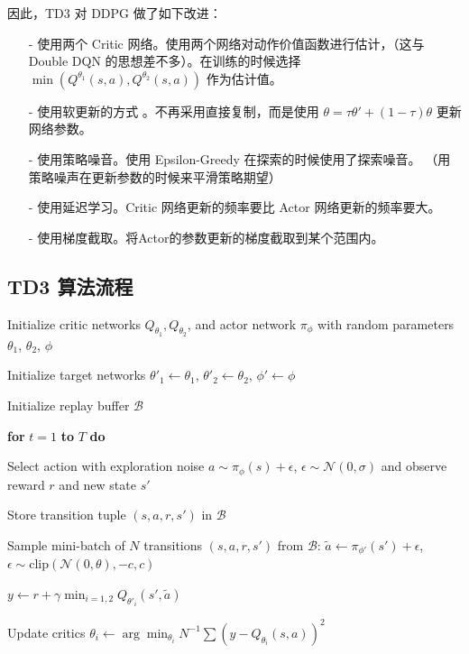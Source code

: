 因此，TD3 对 DDPG 做了如下改进：
\begin{itemize}
\item[-]
使用两个 Critic 网络。使用两个网络对动作价值函数进行估计，（这与 Double DQN 
的思想差不多）。在训练的时候选择 $\min\left( Q^{\theta_1}(s,a), Q^{\theta_2}(s,a) \right)$ 
作为估计值。

\item[-]
使用软更新的方式 。不再采用直接复制，而是使用 $\theta = \tau\theta' + (1 - \tau) 
\theta$ 更新网络参数。

\item[-]
使用策略噪音。使用 Epsilon-Greedy 在探索的时候使用了探索噪音。
（用策略噪声在更新参数的时候来平滑策略期望）

\item[-]
使用延迟学习。Critic 网络更新的频率要比 Actor 网络更新的频率要大。

\item[-]
使用梯度截取。将Actor的参数更新的梯度截取到某个范围内。
\end{itemize}


\subsection{TD3 算法流程}

Initialize critic networks $Q_{\theta_1}, Q_{\theta_2}$, and actor 
network $\pi_\phi$ with random parameters $\theta_1$, $\theta_2$, $\phi$ 

Initialize target networks $\theta'_1 \leftarrow \theta_1$, 
$\theta'_2 \leftarrow \theta_2$, $\phi' \leftarrow \phi$ 

Initialize replay buffer $\mathcal{B}$ 

{\bf for} $t=1$ {\bf to} $T$ {\bf do} 

	\setlength\parindent{4em}
	Select action with exploration noise $a\sim\pi_\phi(s) + \epsilon$,
		$\epsilon\sim\mathcal{N}(0, \sigma)$ and observe reward $r$ and new state $s'$

	\setlength\parindent{4em}
	Store transition tuple $(s,a,r,s')$ in $\mathcal{B}$

	\setlength\parindent{4em}
	Sample mini-batch of $N$ transitions $(s,a,r,s')$ from $\mathcal{B}$: 
		$\tilde{a} \leftarrow \pi_{\phi'}(s') + \epsilon$,
		$\epsilon\sim\text{clip}(\mathcal{N}(0,\theta), -c, c)$ 

		\setlength\parindent{5em}
		$y \leftarrow r + \gamma\min_{i=1,2}Q_{\theta'_i} (s',\tilde{a})$

	\setlength\parindent{4em}
	Update critics $\theta_i \leftarrow \arg\min_{\theta_i} 
	N^{-1}\sum\left(y-Q_{\theta_i}(s,a)\right)^2$

